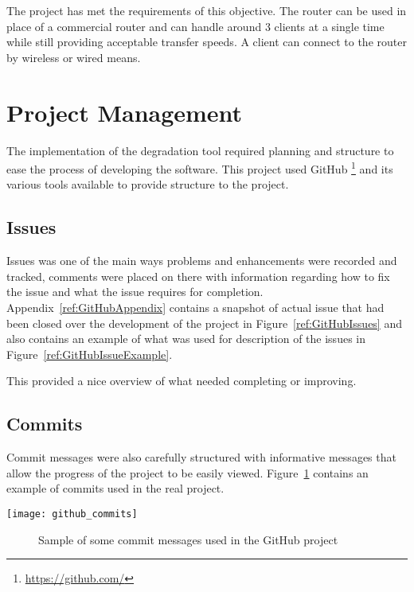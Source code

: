 The project has met the requirements of this objective. The router can be used in place of a commercial router and can handle around 3 clients at a single time while still providing acceptable transfer speeds. A client can connect to the router by wireless or wired means.

\section{Project Management}
The implementation of the degradation tool required planning and structure to ease the process of developing the software. This project used GitHub \footnote{\url{https://github.com/}} and its various tools available to provide structure to the project.

\subsection{Issues}
Issues was one of the main ways problems and enhancements were recorded and tracked, comments were placed on there with information regarding how to fix the issue and what the issue requires for completion. Appendix~\ref{ref:GitHubAppendix} contains a snapshot of actual issue that had been closed over the development of the project in Figure~\ref{ref:GitHubIssues} and also contains an example of what was used for description of the issues in Figure~\ref{ref:GitHubIssueExample}.

This provided a nice overview of what needed completing or improving.

\subsection{Commits}
Commit messages were also carefully structured with informative messages that allow the progress of the project to be easily viewed. Figure~\ref{ref:githubCommits} contains an example of commits used in the real project.

\begin{center}
	\texttt{[image: github\_commits]}
	\begin{figure}[h]
		\caption{Sample of some commit messages used in the GitHub project}
		\label{ref:githubCommits}
	\end{figure}
\end{center}

